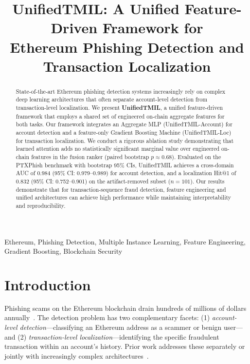 \documentclass[conference]{IEEEtran}
\newcommand{\ours}{UnifiedTMIL}
\begin{document}
\title{UnifiedTMIL: A Unified Feature-Driven Framework for\\
Ethereum Phishing Detection and Transaction Localization}

\author{
}

\maketitle

\begin{abstract}
State-of-the-art Ethereum phishing detection systems increasingly rely on complex deep learning architectures that often separate account-level detection from transaction-level localization. We present \textbf{\ours{}}, a unified feature-driven framework that employs a shared set of engineered on-chain aggregate features for both tasks. Our framework integrates an Aggregate MLP (\ours{}-Account) for account detection and a feature-only Gradient Boosting Machine (\ours{}-Loc) for transaction localization. We conduct a rigorous ablation study demonstrating that learned attention adds no statistically significant marginal value over engineered on-chain features in the fusion ranker (paired bootstrap $p \approx 0.68$). Evaluated on the PTXPhish benchmark with bootstrap 95\% CIs, \ours{} achieves a cross-domain AUC of $\mathbf{0.984}$ (95\% CI: 0.979--0.989) for account detection, and a localization Hit@1 of $\mathbf{0.832}$ (95\% CI: 0.752--0.901) on the artifact-removed subset ($n{=}101$). Our results demonstrate that for transaction-sequence fraud detection, feature engineering and unified architectures can achieve high performance while maintaining interpretability and reproducibility.
\end{abstract}

\begin{IEEEkeywords}
Ethereum, Phishing Detection, Multiple Instance Learning, Feature Engineering, Gradient Boosting, Blockchain Security
\end{IEEEkeywords}

\section{Introduction}\label{sec:intro}

Phishing scams on the Ethereum blockchain drain hundreds of millions of dollars annually~\cite{ptxphish}. The detection problem has two complementary facets: (1) \emph{account-level detection}---classifying an Ethereum address as a scammer or benign user---and (2) \emph{transaction-level localization}---identifying the specific fraudulent transaction within an account's history. Prior work addresses these separately or jointly with increasingly complex architectures~\cite{bert4eth, zipzap, tsgn}.
\end{document}
